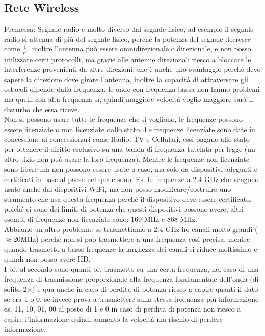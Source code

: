 \documentclass[11pt, twocolumn]{article}
\begin{document}
\subsection{Rete Wireless}
Premessa: Segnale radio è molto diverso dal segnale fisico, ad esempio il segnale radio si attenua di più del segnale fisico, perché la potenza del segnale decresce come $\frac{1}{r^2}$, inoltre l'antenna può essere omnidirezionale o direzionale, e non posso utilizzare certi protocolli, ma grazie alle antenne direzionali riesco a bloccare le interferenze provenienti da altre direzioni, che è anche uno svantaggio perché devo sapere la direzione dove girare l'antenna, inoltre la capacità di attraversare gli ostacoli dipende dalla frequenza, le onde con frequenza bassa non hanno problemi ma quelli con alta frequenza sì, quindi maggiore velocità voglio maggiore sarà il disturbo che essa riceve.\\
Non si possono usare tutte le frequenze che si vogliono, le frequenze possono essere licenziate o non licenziate dallo stato.
Le frequenze licenziate sono date in concessione ai concessionari come Radio, TV e Cellulari, essi pagano allo stato per ottenere il diritto esclusivo su una banda di frequenza tutelata per legge (un altro tizio non può usare la loro frequenza).
Mentre le frequenze non licenziate sono libere ma non possono essere usate a caso, ma solo da dispositivi adeguati e certificati in base al paese nel quale sono.
Es. le frequenze a 2.4 GHz che vengono usate anche dai dispositivi WiFi, ma non posso modificare/costruire uno strumento che usa questa frequenza perché il dispositivo deve essere certificato, poiché ci sono dei limiti di potenza che questi dispositivi possono avere, altri esempi di frequenze non licenziate sono: 169 MHz e 868 MHz.\\
Abbiamo un altro problema: se trasmettiamo a 2.4 GHz ho canali molto grandi ($\approx 20$MHz) perché non si può trasmettere a una frequenza così precisa, mentre quando trasmetto a basse frequenze la larghezza dei canali si riduce moltissimo e quindi non posso avere HD.\\
I bit al secondo sono quanti bit trasmetto su una certa frequenza, nel caso di una frequenza di trasmissione proporzionale alla frequenza fondamentale dell'onda (di solito 2$\times$) e qua anche in caso di perdita di potenza riesco a capire quanti il dato se era 1 o 0, se invece prova a trasmettere sulla stessa frequenza più informazione es. 11, 10, 01, 00 al posto di 1 e 0 in caso di perdita di potenza non riesco a capire l'informazione quindi aumento la velocità ma rischio di perdere informazione.\\
\end{document}
